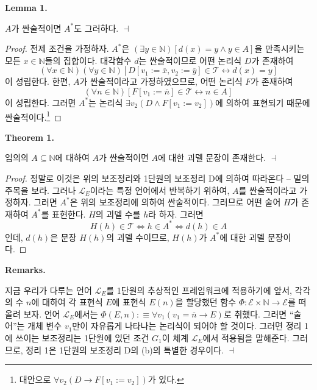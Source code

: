 \documentclass[12pt]{paper}
\newenvironment{context}[1][]
{ \noindent \textbf{{#1}.}
}
{ \hfill $ \dashv $ }
\begin{document}
\begin{context}[Lemma 1]
$A$가 싼술적이면 $A^{*}$도 그러하다.
\end{context}

\begin{proof}
전제 조건을 가정하자.
$A^{*}$은 $\left( \exists y \in \mathbb{N} \right) \left[ d \left( x \right) = y \land y \in A \right]$을 만족시키는 모든 $x \in \mathbb{N}$들의 집합이다.
대각함수 $d$는 싼술적이므로 어떤 논리식 $D$가 존재하여 $$ \left( \forall x \in \mathbb{N} \right) \left( \forall y \in \mathbb{N} \right) \left[ D \left[ v_1 := \overline{x} , v_2 := \overline{y} \right] \in \mathcal{T} \leftrightarrow d \left( x \right) = y \right] $$이 성립한다.
한편, $A$가 싼술적이라고 가정하였으므로, 어떤 논리식 $F$가 존재하여 $$ \left( \forall n \in \mathbb{N} \right) \left[ F \left[ v_1 := \overline{n} \right] \in \mathcal{T} \leftrightarrow n \in A \right]$$이 성립한다.
그러면 $A^{*}$는 논리식 $\exists v_2 \left( D \land F \left[ v_1 := v_2 \right] \right)$에 의하여 표현되기 때문에 싼술적이다.\footnote
{
대안으로 $\forall v_2 \left( D \rightarrow F \left[ v_1 := v_2 \right] \right)$가 있다.
}
\end{proof}

\begin{context}[Theorem 1]
임의의 $A \subseteq \mathbb{N}$에 대하여 $A$가 싼술적이면 $A$에 대한 괴델 문장이 존재한다.
\end{context}

\begin{proof}
정말로 이것은 위의 보조정리와 1단원의 보조정리 D에 의하여 따라온다 -- 밑의 주목을 보라.
그러나 $\mathcal{L}_{E}$이라는 특정 언어에서 반복하기 위하여, $A$를 싼술적이라고 가정하자.
그러면 $A^{*}$은 위의 보조정리에 의하여 싼술적이다.
그러므로 어떤 술어 $H$가 존재하여 $A^{*}$를 표현한다.
$H$의 괴델 수를 $h$라 하자.
그러면 $$H \left( h \right) \in \mathcal{T} \iff h \in A^{*} \iff d \left( h \right) \in A$$인데,
$d \left( h \right)$은 문장 $H \left( h \right)$의 괴델 수이므로,
$H \left( h \right)$가 $A^{*}$에 대한 괴델 문장이다.
\end{proof}

\begin{context}[Remarks]
지금 우리가 다루는 언어 $\mathcal{L}_{E}$를 1단원의 추상적인 프레임워크에 적용하기에 앞서,
각각의 수 $n$에 대하여 각 표현식 $E$에 표현식 $E \left( n \right)$을 할당했던 함수 $\Phi : \mathcal{E} \times \mathbb{N} \to \mathcal{E}$를 떠올려 보자.
언어 $\mathcal{L}_{E}$에서는 $\Phi \left( E , n \right) : \equiv \forall v_1 \left( v_1 = \overline{n} \rightarrow E \right)$로 취했다.
그러면 ``술어''는 개체 변수 $v_1$만이 자유롭게 나타나는 논리식이 되어야 할 것이다.
그러면 정리 1에 쓰이는 보조정리는 1단원에 있던 조건 $G_1$이 체계 $\mathcal{L}_{E}$에서 적용됨을 말해준다.
그러므로, 정리 1은 1단원의 보조정리 D의 (b)의 특별한 경우이다.
\end{context}
\end{document}
